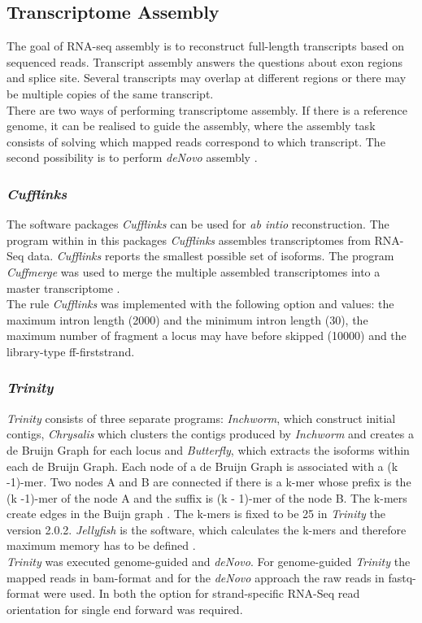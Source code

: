 \documentclass[12pt, a4paper]{report}
\begin{document}
\subsection*{Transcriptome Assembly}
The goal of RNA-seq assembly is to reconstruct full-length transcripts based on sequenced reads. Transcript assembly answers the questions about exon regions and splice site. Several transcripts may overlap at different regions or there may be multiple copies of the same transcript. \\
There are two ways of performing transcriptome assembly. If there is a reference genome, it can be realised to guide the assembly, where the assembly task consists of solving which mapped reads correspond to which transcript. The second possibility is to perform \textit{deNovo} assembly \cite{Korpelainen2014}.  

\subsubsection*{\textit{Cufflinks}}
The software packages \textit{Cufflinks} can be used for \textit{ab intio} reconstruction. The program within in this packages \textit{Cufflinks} assembles transcriptomes from RNA-Seq data. \textit{Cufflinks} reports the smallest possible set of isoforms. The program \textit{Cuffmerge} was used to merge the multiple assembled transcriptomes into a master transcriptome \cite{Trapnell2010}. \\
The rule \textit{Cufflinks} was implemented with the following option and values: the maximum intron length (2000) and the minimum intron length (30), the maximum number of fragment a locus may have before skipped (10000) and the library-type ff-firststrand.

\subsubsection*{\textit{Trinity}}
\textit{Trinity} consists of three separate programs: \textit{Inchworm}, which construct initial contigs, \textit{Chrysalis} which clusters the contigs produced by \textit{Inchworm} and creates a de Bruijn Graph for each locus and \textit{Butterfly}, which extracts the isoforms within each de Bruijn Graph. 
Each node of a de Bruijn Graph is associated with a (k -1)-mer. Two nodes A and B are connected if there is a k-mer whose prefix is the (k -1)-mer of the node A and the suffix is (k - 1)-mer of the node B. The k-mers create edges in the Buijn graph \cite{Korpelainen2014}. The k-mers is fixed to be 25 in \textit{Trinity} the version 2.0.2.
\textit{Jellyfish} is the software, which calculates the k-mers and therefore maximum memory has to be defined \cite{Grabherr2013}. 
\ \\
\textit{Trinity} was executed genome-guided and \textit{deNovo}. For genome-guided \textit{Trinity} the mapped reads in bam-format and for the \textit{deNovo} approach the raw reads in fastq-format were used. In both the option for strand-specific RNA-Seq read orientation for single end forward was required. 
\end{document}
